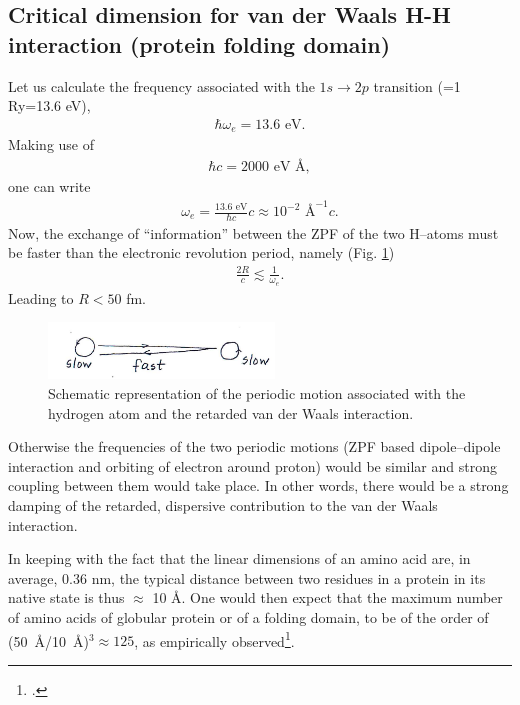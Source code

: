 \begin{subappendices}
 \subsection{Critical dimension for van der Waals H-H interaction (protein folding domain)}
 Let us calculate the frequency associated with the $1s\to 2p$ transition (=1 Ry=13.6 eV),
 \begin{align}\label{eq2.D.22}
\hbar\omega_e=13.6\text{ eV}.    
 \end{align} 
 Making use of
 \begin{align}\label{eq2.D.23}
 \hbar c=2000\text{ eV \AA},
 \end{align} 
 one can write
 \begin{align}\label{eq2.D.24}
 \omega_e=\frac{13.6\text{ eV}}{\hbar c}c\approx 10^{-2}\text{ \AA}^{-1}c.
 \end{align} 
 Now, the exchange of ``information'' between the ZPF of the two H--atoms must be faster than the electronic revolution period, namely (Fig. \ref{fig2.D.6})
  \begin{align}\label{eq2.D.25}
  \frac{2R}{c}\lesssim\frac{1}{\omega_e}.
  \end{align} 
  Leading to $R<50$ fm.
       \begin{figure}[h!]
        \centerline{\includegraphics*[width=6cm,angle=0]{nutshell/figs/fig2D6.pdf}}
        \caption{Schematic representation of the periodic motion associated with the hydrogen atom and the retarded van der Waals interaction.}\label{fig2.D.6}
        \end{figure}
 
 Otherwise the frequencies of the two periodic motions (ZPF based dipole--dipole interaction and orbiting of electron around proton) would be similar and strong coupling between them would take place. In other words, there would be a strong damping of the retarded, dispersive contribution to the van der Waals interaction.
 
 In keeping with the fact that the linear dimensions of an amino acid are, in average, 0.36 nm, the typical distance between two residues in a protein in its native state is thus $\approx$ 10 \AA. One would then expect that the maximum number of amino acids of globular protein or of a folding domain, to be of the order of \mbox{(50 \AA/10 \AA)$^{3}\approx 125$}, as empirically observed\footnote{\cite{Rost:97}.}.

\end{subappendices}
